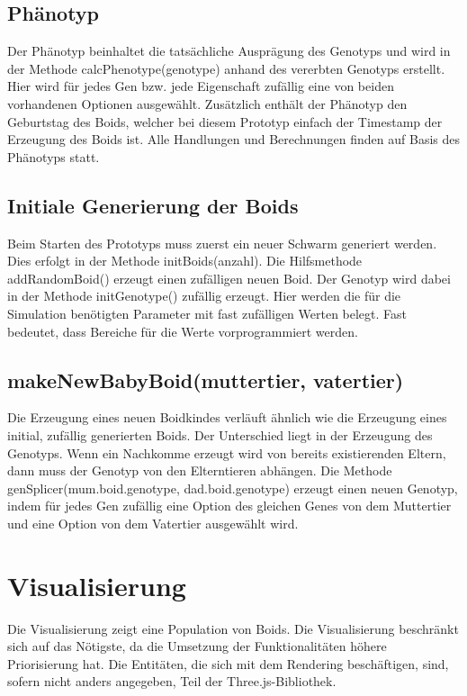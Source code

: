 \documentclass[draft=false
              ,paper=a4
              ,twoside=false
              ,fontsize=11pt
              ,headsepline
              ,BCOR10mm
              ,DIV11
              ,bibtotoc
              ,liststotoc
              ]{scrbook}
\begin{document}
\subsection{Phänotyp}
Der Phänotyp beinhaltet die tatsächliche Ausprägung des Genotyps und wird in der Methode calcPhenotype(genotype) anhand des vererbten Genotyps erstellt. Hier wird für jedes Gen bzw. jede Eigenschaft zufällig eine von beiden vorhandenen Optionen ausgewählt. Zusätzlich enthält der Phänotyp den Geburtstag des Boids, welcher bei diesem Prototyp einfach der Timestamp der Erzeugung des Boids ist. Alle Handlungen und Berechnungen finden auf Basis des Phänotyps statt.

\subsection{Initiale Generierung der Boids}
Beim Starten des Prototyps muss zuerst ein neuer Schwarm generiert werden. Dies erfolgt in der Methode initBoids(anzahl). Die Hilfsmethode addRandomBoid() erzeugt einen zufälligen neuen Boid. Der Genotyp wird dabei in der Methode initGenotype() zufällig erzeugt. Hier werden die für die Simulation benötigten Parameter mit fast zufälligen Werten belegt. Fast bedeutet, dass Bereiche für die Werte vorprogrammiert werden.

\subsection{makeNewBabyBoid(muttertier, vatertier)}\label{babies}
Die Erzeugung eines neuen Boidkindes verläuft ähnlich wie die Erzeugung eines initial, zufällig generierten Boids. Der Unterschied liegt in der Erzeugung des Genotyps. Wenn ein Nachkomme erzeugt wird von bereits existierenden Eltern, dann muss der Genotyp von den Elterntieren abhängen. Die Methode genSplicer(mum.boid.genotype, dad.boid.genotype) erzeugt einen neuen Genotyp, indem für jedes Gen zufällig eine Option des gleichen Genes von dem Muttertier und eine Option von dem Vatertier ausgewählt wird.

\section{Visualisierung}\label{visual}
Die Visualisierung zeigt eine Population von Boids. Die Visualisierung beschränkt sich auf das Nötigste, da die Umsetzung der Funktionalitäten höhere Priorisierung hat.
Die Entitäten, die sich mit dem Rendering beschäftigen, sind, sofern nicht anders angegeben, Teil der Three.js-Bibliothek.
\end{document}

